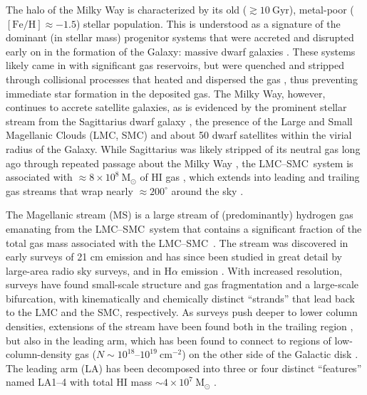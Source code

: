 \documentclass[modern]{aastex62}
\newcommand{\msun}{\textrm{M}_\odot}
\newcommand{\feh}{\ensuremath{[\textrm{Fe} / \textrm{H}]}}
\newcommand{\hi}{H{\footnotesize I} }
\newcommand{\lmcsmc}{LMC--SMC}
\begin{document}
The halo of the Milky Way is characterized by its old ($\gtrsim 10~\textrm{Gyr}$), metal-poor ($\feh \approx -1.5$) stellar population.
This is understood as a signature of the dominant (in stellar mass) progenitor systems that were accreted and disrupted early on in the formation of the Galaxy: massive dwarf galaxies \citep[e.g.,][]{Deason:2015, Fiorentino:2015}.
These systems likely came in with significant gas reservoirs, but were quenched and stripped through collisional processes that heated and dispersed the gas \citep[e.g.,][]{Mayer:2006}, thus preventing immediate star formation in the deposited gas.
The Milky Way, however, continues to accrete satellite galaxies, as is evidenced by the prominent stellar stream from the Sagittarius dwarf galaxy \citep{Ibata:1994, Majewski:2003}, the presence of the Large and Small Magellanic Clouds (LMC, SMC) and about 50 dwarf satellites within the virial radius of the Galaxy.
While Sagittarius was likely stripped of its neutral gas long ago through repeated passage about the Milky Way \citep{Burton:1999, Tepper-Garcia:2018}, the \lmcsmc\ system is associated with $\approx 8\times 10^8~\msun$ of \hi gas \citep{Bruns:2005}, which extends into leading and trailing gas streams that wrap nearly $\approx 200^\circ$ around the sky \citep{Mathewson:1974, Putman:1998, Bruns:2005, Nidever:2010}.

The Magellanic stream (MS) is a large stream of (predominantly) hydrogen gas emanating from the \lmcsmc\ system that contains a significant fraction of the total gas mass associated with the \lmcsmc\ \citep{Bruns:2005}.
The stream was discovered in early surveys of 21 cm emission and has since been studied in great detail by large-area radio sky surveys, and in H$\alpha$ emission \citep{Weiner:1996, Barger:2017}.
With increased resolution, surveys have found small-scale structure and gas fragmentation \citep[e.g.,][]{Nidever:2008, For:2014} and a large-scale bifurcation, with %
kinematically \citep{Nidever:2008} and chemically \citep{Fox:2013} distinct ``strands'' that lead back to the LMC and the SMC, respectively.
As surveys push deeper to lower column densities, extensions of the stream have been found both in the trailing region \citep{Nidever:2010}, but also in the leading arm, which has been found to connect to regions of low-column-density gas ($N\sim 10^{18}$--$10^{19}~\textrm{cm}^{-2}$) on the other side of the Galactic disk \citep{Putman:1998, Nidever:2008}.
The leading arm (LA) has been decomposed into three or four distinct ``features'' named LA1--4 \citep{Bruns:2005, Nidever:2008, Venzmer:2012} with total HI mass $\sim 4 \times10^7~\msun$ \citep{Venzmer:2012}.
\end{document}
